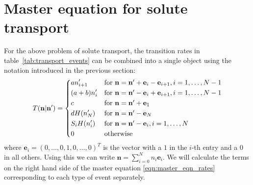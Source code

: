 \documentclass[a4paper,11pt]{article}
\numberwithin{equation}{section}
\newcommand{\V}[1]{\mathbf{#1}}
\begin{document}
\section{Master equation for solute transport}
For the above problem of solute transport, the transition rates in
table~\ref{tab:transport_events} can be combined into a single object using the
notation introduced in the previous section:
\begin{equation}
    \label{eqn:transition_rates_zeroth_order}
    T(\V{n}|\V{n}') =%
        \begin{dcases*}
            a n'_{i+1} & for \(\V{n} = \V{n}' + \V{e}_i - \V{e}_{i+1},
            i=1,\dotsc,N-1\)\\
            (a+b) n'_i & for \(\V{n} = \V{n}' - \V{e}_i + \V{e}_{i+1},
            i=1,\dotsc,N-1\)\\
            c & for \(\V{n} = \V{n}' + \V{e}_1\)\\
            d H(n'_N) & for \(\V{n} = \V{n}' - \V{e}_N\)\\
            S_i H(n'_i) & for \(\V{n} = \V{n}' - \V{e}_i, i=1,\dotsc,N\)\\
            0 & otherwise
        \end{dcases*}
\end{equation}
where \(\V{e}_i = (0,\dotsc,0,1,0,\dotsc,0)^T\) is the vector with a \(1\) in
the \(i\)-th entry and a \(0\) in all others. Using this we can write \(\V{n} =
\sum_{i=0}^{N} n_i \V{e}_i\). We will calculate the terms on the right hand side
of the master equation \eqref{eqn:master_eqn_rates} corresponding to each type
of event separately.
\end{document}
